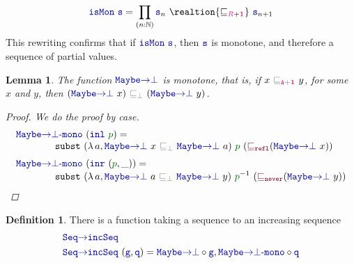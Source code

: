 \documentclass[twoside,11pt,openright]{report}
\theoremstyle{plain} %
\newtheorem{lem}[thm]{Lemma}
\theoremstyle{definition}
\newtheorem{defn}{Definition}[section]
\theoremstyle{remark}
\newcommand*{\pathterm}[1]{\textcolor{green!40!black}{#1}}
\newcommand*{\type}[1]{\textcolor{magenta!90!black}{#1}}
\newcommand*{\unit}{\type{\textbf{1}}}
\newcommand*{\relation}[1]{\textcolor{gray}{\ensuremath{\mathtt{#1}}}}
\newcommand*{\function}[1]{\textcolor{blue!60!black}{\ensuremath{\mathtt{#1}}}}
\newcommand*{\constructor}[1]{\textcolor{purple!60!black}{\ensuremath{\mathtt{#1}}}}
\newcommand*{\sym}[1]{\ensuremath{#1^{-1}}}
\begin{document}
\begin{equation}
  \function{isMon}~\function{s} = \prod_{(n : \mathbb{N})} \function{s}_n~\realtion{\sqsubseteq_{\type{R} + \unit}}~\function{s}_{n+1}
\end{equation}
This rewriting confirms that if \(\function{isMon}~\function{s}\), then \(\function{s}\) is monotone, and therefore a sequence of partial values.
\begin{lem}
  The function \(\function{Maybe{\rightarrow}\bot}\) is monotone, that is, if \(x~\relation{\sqsubseteq_{\type{A} + \unit}}~y\), for some \(x\) and \(y\), then \((\function{Maybe{\rightarrow}\bot}~x)~\relation{\sqsubseteq_{\bot}}~(\function{Maybe{\rightarrow}\bot}~y)\).
  \begin{proof}
    We do the proof by case.
    \begin{equation}
      \begin{aligned}
        &\function{Maybe{\rightarrow}\bot\text{-}mono}~(\function{inl}~\pathterm{p}) = \\[-1mm]
        &\qquad\qquad \mathtt{subst}~(\lambda\,a, \function{Maybe{\rightarrow}\bot}~x~\relation{\sqsubseteq_{\bot}}~\function{Maybe{\rightarrow}\bot}~a)~\pathterm{p}~(\constructor{\sqsubseteq_{refl}} (\function{Maybe{\rightarrow}\bot}~x)) \\[1mm]
        &\function{Maybe{\rightarrow}\bot\text{-}mono}~(\function{inr}~(\pathterm{p}, \_)) = \\[-1mm]
        &\qquad\qquad \mathtt{subst}~(\lambda\,a, \function{Maybe{\rightarrow}\bot}~a~\relation{\sqsubseteq_{\bot}}~\function{Maybe{\rightarrow}\bot}~y)~\sym{\pathterm{p}}~(\constructor{\sqsubseteq_{never}} (\function{Maybe{\rightarrow}\bot}~y))
      \end{aligned}
    \end{equation}
\end{proof}
\end{lem}
\begin{defn}
  There is a function taking a sequence to an increasing sequence
  \begin{equation}
    \begin{aligned}
      &\function{Seq{\rightarrow}incSeq} \\
      &\function{Seq{\rightarrow}incSeq}~(\function{g} , \function{q}) = \function{Maybe{\rightarrow}\bot} \circ \function{g} , \function{Maybe{\rightarrow}\bot\text{-}mono} \circ \function{q}
    \end{aligned}
  \end{equation}
\end{defn}
\end{document}
